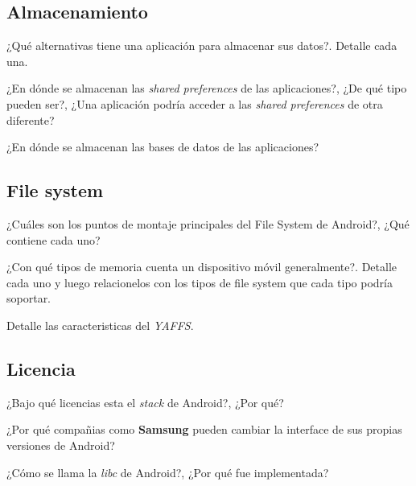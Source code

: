 \subsection{Almacenamiento}
\begin{questions}
  \question ¿Qué alternativas tiene una aplicación para almacenar sus datos?. Detalle cada una.

  \question ¿En dónde se almacenan las \textit{shared preferences} de las aplicaciones?, ¿De qué tipo pueden ser?, ¿Una aplicación podría acceder a las \textit{shared preferences} de otra diferente?
  
  \question ¿En dónde se almacenan las bases de datos de las aplicaciones?
\end{questions}

\subsection{File system}
\begin{questions}
  \question ¿Cuáles son los puntos de montaje principales del File System de Android?, ¿Qué contiene cada uno?

  \question ¿Con qué tipos de memoria cuenta un dispositivo móvil generalmente?. Detalle cada uno y luego relacionelos con los tipos de file system que cada tipo podría soportar.
  
  \question Detalle las caracteristicas del \textit{YAFFS}.
\end{questions}

\subsection{Licencia}
\begin{questions}
  \question ¿Bajo qué licencias esta el \textit{stack} de Android?, ¿Por qué?

  \question ¿Por qué compañias como \textbf{Samsung} pueden cambiar la interface de sus propias versiones de Android?
  
  \question ¿Cómo se llama la \textit{libc} de Android?, ¿Por qué fue implementada?
\end{questions}

